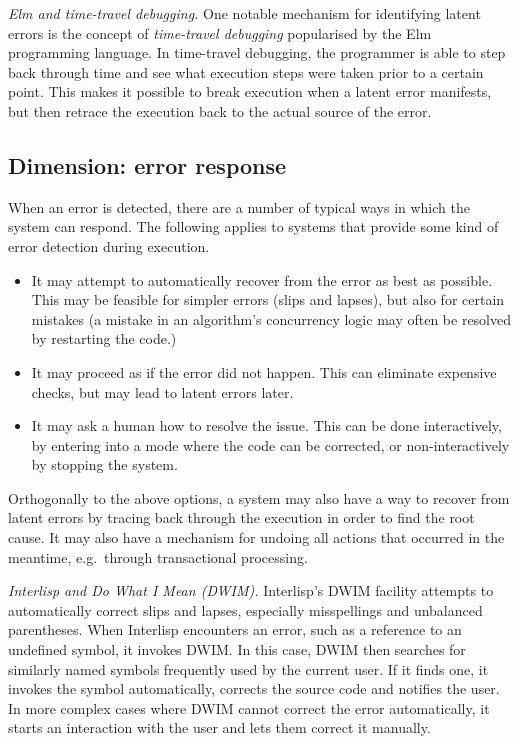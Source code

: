 \documentclass[ twoside,openright,titlepage,numbers=noenddot,headinclude,footinclude,cleardoublepage=empty,abstract=on,
                BCOR=5mm,paper=a4,fontsize=11pt
                ]{scrreprt}
\providecommand{\tightlist}{}\newenvironment{longtable}[2]{\begin{tabular}}{\end{tabular}}
\theoremstyle{definition}
\begin{document}
\emph{Elm and time-travel debugging.} One notable mechanism for
identifying latent errors is the concept of \emph{time-travel debugging}
popularised by the Elm programming language. In time-travel debugging,
the programmer is able to step back through time and see what execution
steps were taken prior to a certain point. This makes it possible to
break execution when a latent error manifests, but then retrace the
execution back to the actual source of the error.

\hypertarget{dimension-error-response}{\subsection{Dimension: error response}\label{dimension-error-response}}

When an error is detected, there are a number of typical ways in which
the system can respond. The following applies to systems that provide
some kind of error detection during execution.

\begin{itemize}
\tightlist
\item
  It may attempt to automatically recover from the error as best as
  possible. This may be feasible for simpler errors (slips and lapses),
  but also for certain mistakes (a mistake in an algorithm's concurrency
  logic may often be resolved by restarting the code.)
\item
  It may proceed as if the error did not happen. This can eliminate
  expensive checks, but may lead to latent errors later.
\item
  It may ask a human how to resolve the issue. This can be done
  interactively, by entering into a mode where the code can be
  corrected, or non-interactively by stopping the system.
\end{itemize}

Orthogonally to the above options, a system may also have a way to
recover from latent errors by tracing back through the execution in
order to find the root cause. It may also have a mechanism for undoing
all actions that occurred in the meantime, e.g.~through transactional
processing.

\emph{Interlisp and Do What I Mean (DWIM).} Interlisp's DWIM facility
attempts to automatically correct slips and lapses, especially
misspellings and unbalanced parentheses. When Interlisp encounters an
error, such as a reference to an undefined symbol, it invokes DWIM. In
this case, DWIM then searches for similarly named symbols frequently
used by the current user. If it finds one, it invokes the symbol
automatically, corrects the source code and notifies the user. In more
complex cases where DWIM cannot correct the error automatically, it
starts an interaction with the user and lets them correct it manually.
\end{document}
